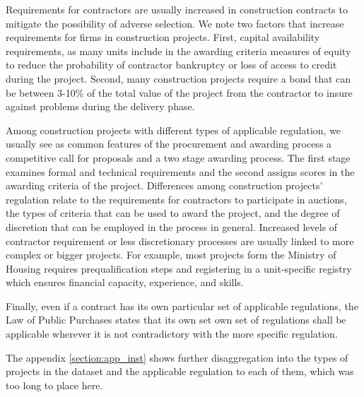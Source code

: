 Requirements for contractors are usually increased in construction contracts to mitigate the possibility of adverse selection. We note two factors that increase requirements for firms in construction projects. First, capital availability requirements, as many units include in the awarding criteria measures of equity to reduce the probability of contractor bankruptcy or loss of access to credit during the project. Second, many construction projects require a bond that can be between 3-10\% of the total value of the project from the contractor to insure against problems during the delivery phase.

Among construction projects with different types of applicable regulation, we usually see as common features of the procurement and awarding process a competitive call for proposals and a two stage awarding process. The first stage examines formal and technical requirements and the second assigns scores in the awarding criteria of the project. Differences among construction projects' regulation relate to the requirements for contractors to participate in auctions, the types of criteria that can be used to award the project, and the degree of discretion that can be employed in the process in general. Increased levels of contractor requirement or less discretionary processes are usually linked to more complex or bigger projects. For example, most projects form the Ministry of Housing requires prequalification steps and registering in a unit-specific registry which ensures financial capacity, experience, and skills.

Finally, even if a contract has its own particular set of applicable regulations, the Law of Public Purchases states that its own set own set of regulations shall be applicable wherever it is not contradictory with the more specific regulation.

The appendix \ref{section:app_inst} shows further disaggregation into the types of projects in the dataset and the applicable regulation to each of them, which was too long to place here.



